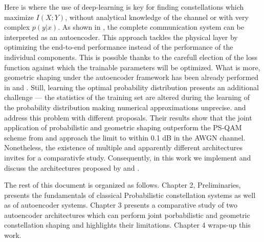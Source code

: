 Here is where the use of deep-learning is key for finding constellations which maximize $I(X;Y)$, without analytical knowledge of the channel or with very complex $p(y|x)$. As shown in \cite{O'Shea}, the complete communication system can be interpreted as an autoencoder. This approach tackles the physical layer by optimizing the end-to-end performance instead of the performance of the individual components. This is possible thanks to the carefull election of the loss function against which the trainable parameters will be optimized. What is more, geometric shaping under the autoencoder framework has been already performed in \cite{O'Shea} and \cite{Jones}. Still, learning the optimal probability distribution presents an additional challenge --- the statistics of the training set are altered during the learning of the probability distribution making numerical approximations unprecise. \cite{Stark} and \cite{Aref} address this problem with different proposals. Their results show that the joint application of probabilistic and geometric shaping outperform the PS-QAM scheme from \cite{Boecherer} and approach the limit to within 0.1 dB in the AWGN channel. Nonetheless, the existence of multiple and apparently different architectures invites for a comparativfe study. Consequently, in this work we implement and discuss the architectures proposed by \cite{Stark} and \cite{Aref}.

The rest of this document is organized as follows. Chapter 2, Preliminaries, presents the fundamentals of classical Probabilistic constellation systems as well as of autoencoder systems. Chapter 3 presents a comparative study of two autoencoder architectures which can perform joint porbabilistic and geometric constellation shaping and highlights their limitations. Chapter 4 wraps-up this work.
